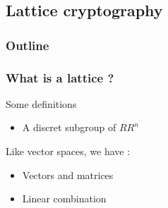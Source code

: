 \documentclass{beamer}
\begin{document}
\subsection{Lattice cryptography}
\begin{frame}
  \frametitle{Outline}
\end{frame}

\subsubsection{What is a lattice ?}
\begin{frame}{Some definitions}
	\begin{itemize}
		\item A discret subgroup of $RR^n$
	\end{itemize}

	Like vector spaces, we have :
	\begin{itemize}
		\item Vectors and matrices
		\item Linear combination
	\end{itemize}
\end{frame}
\end{document}
